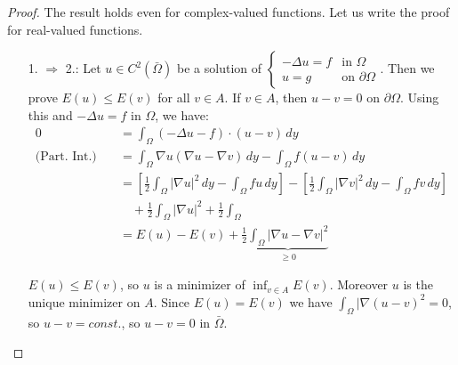 \documentclass{report}
\theoremstyle{tommy}
\begin{document}
  \begin{proof}
    The result holds even for complex-valued functions. Let us write the proof for real-valued functions.
    \begin{itemize}
      \item[1. \(\Rightarrow\) 2.:] Let \(u \in C^2(\bar \Omega)\) be a solution of \(\begin{cases}
        - \Delta u = f &\text{in } \Omega \\ u = g &\text{on } \partial \Omega
      \end{cases}\). Then we prove \(E(u) \le E(v)\) for all \(v \in A\). If \(v \in A\), then \(u - v = 0\) on \(\partial \Omega\). Using this and \(-\Delta u = f\) in \(\Omega\), we have:
      \begin{align*}
        0 
        &= \int_\Omega (-\Delta u - f)\cdot(u-v) \, dy  \\
        \text{(Part. Int.)} \quad &= \int_\Omega \nabla u (\nabla u - \nabla v) \, dy - \int_\Omega f (u-v) \, dy \\
        &= \left[\frac{1}{2} \int_\Omega |\nabla u|^2 \, dy - \int_\Omega fu \, dy\right] - \left[\frac{1}{2} \int_\Omega |\nabla v|^2 \, dy - \int_\Omega f v \, dy\right] \\
        &\quad+ \frac{1}{2} \int_\Omega |\nabla u|^2 + \frac{1}{2} \int_\Omega  \\
        &= E(u) - E(v) + \frac{1}{2} \underbrace{\int_\Omega |\nabla u - \nabla v|^2}_{\ge 0}
      \end{align*}
    
      \(E(u) \le E(v)\), so \(u\) is a minimizer of \(\inf_{v \in A} E(v)\). Moreover \(u\) is the unique minimizer on \(A\). Since \(E(u) = E(v)\) we have \(\int_\Omega|\nabla (u-v)^2 = 0\), so \(u-v = const.\), so \(u-v = 0\) in \(\bar \Omega\).


\end{itemize}
\end{proof}
\end{document}
